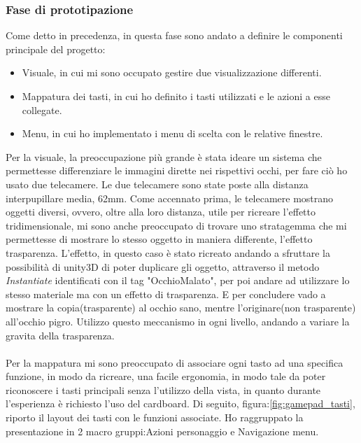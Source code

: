 \documentclass[
a4paper,
cleardoublepage=empty,
headings=twolinechapter,
numbers=autoenddot,
]{scrbook}
\begin{document}
    \subsubsection{Fase di prototipazione}
     Come detto in precedenza, in questa fase sono andato a definire le componenti principale del progetto:
     \begin{itemize}
     	\item Visuale, in cui mi sono occupato gestire due visualizzazione differenti.
     	\item Mappatura dei tasti, in cui ho definito i tasti utilizzati e le azioni a esse collegate.
     	\item Menu, in cui ho implementato i menu di scelta con le relative finestre.
     \end{itemize}
     Per la visuale, la preoccupazione più grande è stata ideare un sistema che permettesse differenziare le immagini dirette nei rispettivi occhi, per fare ciò ho usato due telecamere.
     Le due telecamere sono state poste alla distanza interpupillare media, 62mm\cite{Distanza_occhi}.
     Come accennato prima, le telecamere mostrano oggetti diversi, ovvero, oltre alla loro distanza, utile per ricreare l'effetto tridimensionale, mi sono anche preoccupato di trovare uno stratagemma che mi permettesse di mostrare lo stesso oggetto in maniera differente, l'effetto trasparenza.
     L'effetto, in questo caso è stato ricreato andando a sfruttare la possibilità di unity3D di poter duplicare gli oggetto, attraverso il metodo \textit{Instantiate} identificati con il tag "OcchioMalato", per poi andare ad utilizzare lo stesso materiale ma con un effetto di trasparenza.
     E per concludere vado a mostrare la copia(trasparente) al occhio sano, mentre l'originare(non trasparente) all'occhio pigro.
     Utilizzo questo meccanismo in ogni livello, andando a variare la gravita della trasparenza.\\\\
     Per la mappatura mi sono preoccupato di associare ogni tasto ad una specifica funzione, in modo da ricreare, una facile ergonomia, in modo tale da poter riconoscere i tasti principali senza l'utilizzo della vista, in quanto durante l'esperienza è richiesto l'uso del cardboard.
     Di seguito, figura:\ref{fig:gamepad_tasti}, riporto il layout dei tasti con le funzioni associate.
     Ho raggruppato la presentazione in 2 macro gruppi:Azioni personaggio e Navigazione menu.
\end{document}
